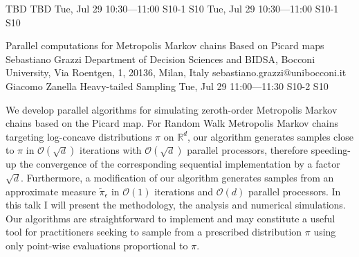 \begin{talk}
  {TBD}%
  {TBD}%
  {Tue, Jul 29 10:30---11:00}%
  {S10-1}%
  {S10}%
  {}%
  {Tue, Jul 29 10:30---11:00}%
  {S10-1}%
  {S10}%
\end{talk}

\begin{talk}
  {Parallel computations for Metropolis Markov chains Based on Picard maps}%
  {Sebastiano Grazzi}%
  {Department of Decision Sciences and BIDSA, Bocconi University, Via Roentgen, 1, 20136, Milan, Italy}%
  {sebastiano.grazzi@unibocconi.it}%
  {Giacomo Zanella}%
  {Heavy-tailed Sampling}%
  {Tue, Jul 29 11:00---11:30}%
  {S10-2}%
  {S10}%
    
   

 We develop parallel algorithms for simulating zeroth-order Metropolis Markov chains based on the Picard map. 
For Random Walk Metropolis Markov chains targeting log-concave distributions $\pi$ on $\mathbb{R}^d$, our algorithm  
generates samples %
close to $\pi$ %
in $\mathcal{O}(\sqrt{d})$ iterations with $\mathcal{O}(\sqrt{d})$ parallel processors, 
therefore speeding-up the convergence of the corresponding sequential implementation by a factor $\sqrt{d}$. Furthermore, a modification of our algorithm generates samples from an approximate measure $\tilde \pi_\epsilon$ in $\mathcal{O}(1)$ iterations and $\mathcal{O}(d)$ parallel processors. In this talk I will present the methodology, the analysis and numerical simulations. Our algorithms are straightforward to implement and may constitute a useful tool for practitioners seeking to sample from a prescribed distribution $\pi$ using only point-wise evaluations proportional to $\pi$.
\end{talk}

